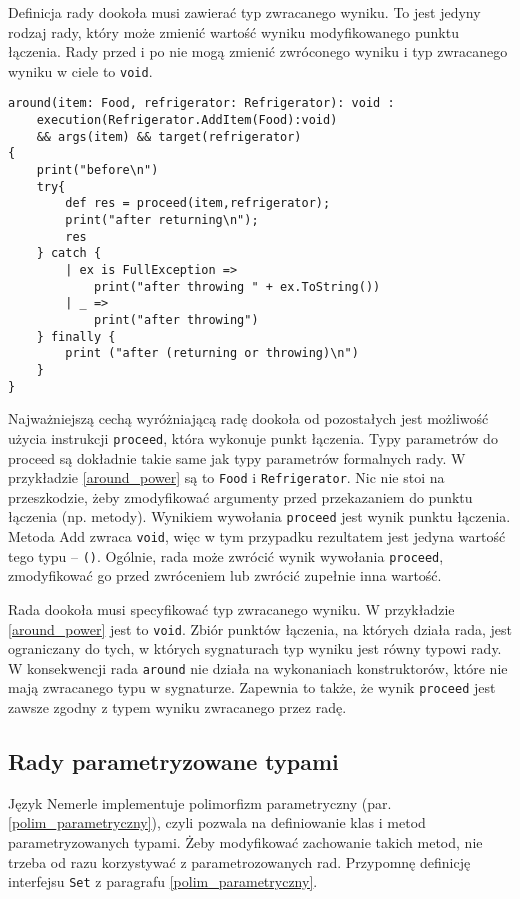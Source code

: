 \documentclass[a4paper,12pt]{mwbk}
\begin{document}
Definicja rady dookoła musi zawierać typ zwracanego wyniku. To
jest jedyny rodzaj rady, który może zmienić wartość wyniku modyfikowanego
punktu łączenia. Rady przed i po nie mogą zmienić zwróconego wyniku i typ zwracanego
wyniku w ciele to \lstinline!void!. 

\begin{lstlisting}[style=AspectJ,caption=Rada dookoła,label=around_power]
around(item: Food, refrigerator: Refrigerator): void :
    execution(Refrigerator.AddItem(Food):void) 
    && args(item) && target(refrigerator) 
{
    print("before\n")
    try{
        def res = proceed(item,refrigerator);
        print("after returning\n");
        res
    } catch {
        | ex is FullException =>
            print("after throwing " + ex.ToString())
        | _ =>
            print("after throwing")
    } finally {
        print ("after (returning or throwing)\n")
    }
}
\end{lstlisting}

Najważniejszą cechą wyróżniającą radę dookoła od pozostałych jest możliwość
użycia instrukcji \lstinline!proceed!, która wykonuje punkt łączenia. Typy
parametrów do proceed są dokładnie takie same jak typy parametrów formalnych
rady. W przykładzie \ref{around_power} są to \lstinline!Food! i
\lstinline!Refrigerator!. Nic nie stoi na przeszkodzie, żeby zmodyfikować
argumenty przed przekazaniem do punktu łączenia (np. metody). Wynikiem
wywołania \lstinline!proceed! jest wynik punktu łączenia.  Metoda Add zwraca
\lstinline!void!, więc w tym przypadku rezultatem jest jedyna wartość tego typu
-- \lstinline!()!. Ogólnie, rada może zwrócić wynik wywołania
\lstinline!proceed!, zmodyfikować go przed zwróceniem lub zwrócić zupełnie inna
wartość.

Rada dookoła musi specyfikować typ zwracanego wyniku. W przykładzie
\ref{around_power} jest to \lstinline!void!. Zbiór punktów łączenia, na których
działa rada, jest ograniczany do tych, w których sygnaturach typ wyniku jest
równy typowi rady. W konsekwencji rada \lstinline!around! nie działa na
wykonaniach konstruktorów, które nie mają zwracanego typu w sygnaturze.
Zapewnia to także, że wynik \lstinline!proceed! jest zawsze zgodny z typem wyniku
zwracanego przez radę.

\subsection{Rady parametryzowane typami}

Język Nemerle implementuje polimorfizm parametryczny (par. \ref{polim_parametryczny}),
czyli pozwala na definiowanie klas i metod parametryzowanych typami. Żeby modyfikować
zachowanie takich metod, nie trzeba od razu korzystywać z parametrozowanych rad. Przypomnę
definicję interfejsu \lstinline!Set! z paragrafu \ref{polim_parametryczny}.
\end{document}
